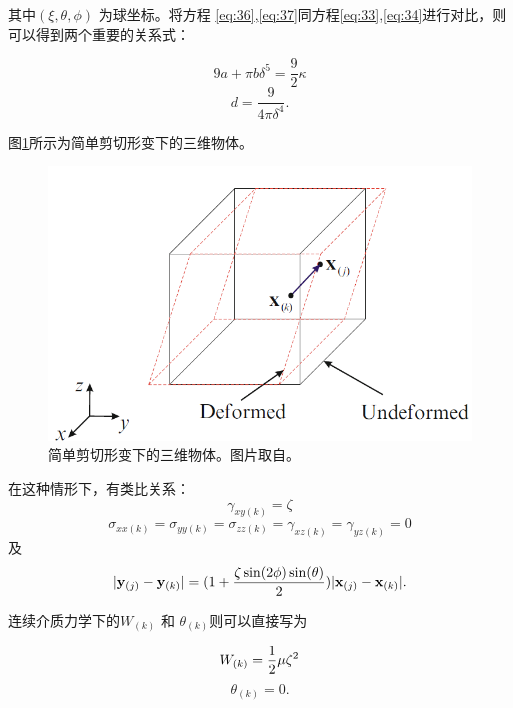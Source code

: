 {{{其中$(\xi,\theta,\phi)$ 为球坐标。将方程 \ref{eq:36},\ref{eq:37}同方程\ref{eq:33},\ref{eq:34}进行对比，则可以得到两个重要的关系式：

\begin{equation}
9a + \pi b\delta^5 = \frac{9}{2}\kappa
\label{eq:38}
\end{equation}
\begin{equation}
d = \frac{9}{4\pi\delta^4}.
\label{eq:39}
\end{equation}


图\ref{pdm_simple_shear}所示为简单剪切形变下的三维物体。
\begin{figure}[htbp!]
  \centering
  \captionsetup{justification=centering}
  \includegraphics[width=0.5\linewidth]{chap/image/pdm_simple_shear}

  \caption{\label{pdm_simple_shear}
           简单剪切形变下的三维物体。图片取自。
          }
\end{figure}

在这种情形下，有类比关系：
\begin{equation}
\gamma_{xy(k)} = \zeta
\label{eq:40}
\end{equation}
\begin{equation}
\sigma_{xx(k)} = \sigma_{yy(k)} = \sigma_{zz(k)} = \gamma_{xz(k)} =\gamma_{yz(k)} = 0
\label{eq:41}
\end{equation}
及
\begin{equation}
|\mathbf{y}_{(j)} - \mathbf{y}_{(k)}| = (1+\frac{\zeta\sin(2\phi)\sin(\theta)}{2})|\mathbf{x}_{(j)} - \mathbf{x}_{(k)}|.
\label{eq:42}
\end{equation}

连续介质力学下的$W_{(k)}$ 和 $\theta_{(k)}$则可以直接写为

\begin{equation}
W_{(k)} = \frac{1}{2}\mu\zeta^2\\
\label{eq:43}
\end{equation}
\begin{equation}
\theta_{(k)} = 0.
\label{eq:44}
\end{equation}

}}}
